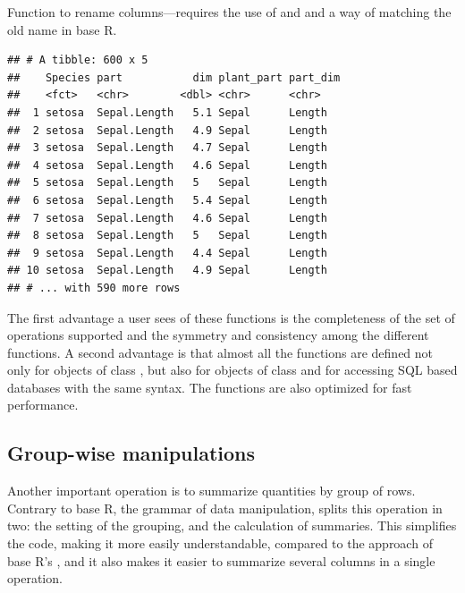 \documentclass[krantz2]{krantz}\usepackage{knitr}%
\begin{document}
Function  to rename columns---requires the use of  and  and a way of matching the old name in base R.

\begin{knitrout}\footnotesize
{}\color{fgcolor}\begin{kframe}
\begin{alltt}
  
\end{alltt}
\begin{verbatim}
## # A tibble: 600 x 5
##    Species part           dim plant_part part_dim
##    <fct>   <chr>        <dbl> <chr>      <chr>   
##  1 setosa  Sepal.Length   5.1 Sepal      Length  
##  2 setosa  Sepal.Length   4.9 Sepal      Length  
##  3 setosa  Sepal.Length   4.7 Sepal      Length  
##  4 setosa  Sepal.Length   4.6 Sepal      Length  
##  5 setosa  Sepal.Length   5   Sepal      Length  
##  6 setosa  Sepal.Length   5.4 Sepal      Length  
##  7 setosa  Sepal.Length   4.6 Sepal      Length  
##  8 setosa  Sepal.Length   5   Sepal      Length  
##  9 setosa  Sepal.Length   4.4 Sepal      Length  
## 10 setosa  Sepal.Length   4.9 Sepal      Length  
## # ... with 590 more rows
\end{verbatim}
\end{kframe}
\end{knitrout}

The first advantage a user sees of these functions is the completeness of the set of operations supported and the symmetry and consistency among the different functions. A second advantage is that almost all the functions are defined not only for objects of class , but also for objects of class  and for accessing SQL based databases with the same syntax. The functions are also optimized for fast performance.

\subsection{Group-wise manipulations}

Another important operation is to summarize quantities by group of rows. Contrary to base R, the grammar of data manipulation, splits this operation in two: the setting of the grouping, and the calculation of summaries. This simplifies the code, making it more easily understandable, compared to the approach of base R's , and it also makes it easier to summarize several columns in a single operation.
\end{document}
